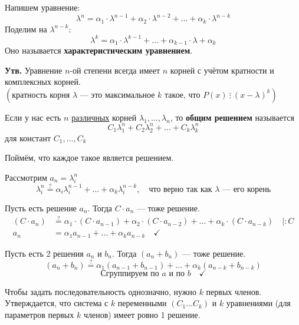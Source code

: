 \documentclass[10pt, a4paper]{article}
\begin{document}
\vspace{0.5em}
\noindent Напишем уравнение:
$$ \lambda^n = \alpha_1 \cdot \lambda^{n-1} + \alpha_2 \cdot \lambda^{n-2} + \dots + \alpha_k \cdot \lambda^{n-k} $$
Поделим на $\lambda^{n-k}$:
$$ \lambda^k = \alpha_1 \cdot \lambda^{k-1} + \dots + \alpha_{k-1} \cdot \lambda + \alpha_k $$
Оно называется \textbf{характеристическим уравнением}.

\medskip
\noindent \textbf{Утв.} Уравнение $n$-ой степени всегда имеет $n$ корней с учётом кратности и комплексных корней. \\
$\left(\text{кратность корня } \lambda \text{ — это максимальное } k \text{ такое, что } P(x) \ \vdots \ (x - \lambda)^k\right)$

\vspace{1.5em}
\noindent Если у нас есть $n$ \underline{различных} корней $\lambda_1, \dots, \lambda_n$, то \textbf{общим решением} называется
$$ C_1 \lambda_1^n + C_2 \lambda_2^n + \dots + C_k \lambda_k^n $$
для констант $C_1, \dots, C_k$

\vspace{1em}
\noindent Поймём, что каждое такое является решением.

\noindent Рассмотрим $a_n = \lambda_i^n$
$$ \lambda_i^n \stackrel{?}{=} \alpha_i \lambda_i^{n-1} + \dots + \alpha_k \lambda_i^{n-k}, \quad \text{что верно так как } \lambda \text{ — его корень} $$

\vspace{0.5em}
\noindent Пусть есть решение $a_n$. Тогда $C \cdot a_n$ — тоже решение.
\begin{align*}
    (C \cdot a_n) &\stackrel{?}{=} \alpha_1 \cdot (C \cdot a_{n-1}) + \alpha_2 \cdot (C \cdot a_{n-2}) + \dots + \alpha_k \cdot (C \cdot a_{n-k}) \quad \Big| : C \\
    a_n &= \alpha_1 a_{n-1} + \dots + \alpha_k a_{n-k} \quad \checkmark
\end{align*}

\noindent Пусть есть 2 решения $a_n$ и $b_n$. Тогда $(a_n + b_n)$ — тоже решение.
$$ (a_n + b_n) \stackrel{?}{=} \alpha_1 (a_{n-1} + b_{n-1}) + \dots + \alpha_k (a_{n-k} + b_{n-k}) $$
$$ \text{Сгруппируем по } a \text{ и по } b \quad \checkmark $$

\vspace{1em}
\noindent Чтобы задать последовательность однозначно, нужно $k$ первых членов. Утверждается, что система с $k$ переменными $(C_1 \dots C_k)$ и $k$ уравнениями (для параметров первых $k$ членов) имеет ровно 1 решение.
\end{document}
